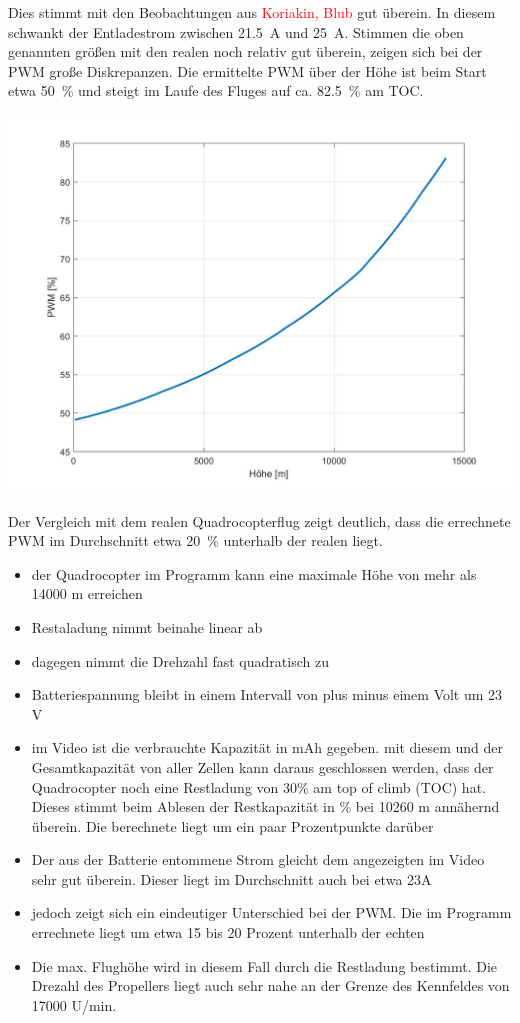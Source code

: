 Dies stimmt mit den Beobachtungen aus \textcolor{red}{Koriakin, Blub} gut überein. In diesem schwankt der Entladestrom zwischen \SI{21,5}{A} und \SI{25}{A}.
Stimmen die oben genannten größen mit den realen noch relativ gut überein, zeigen sich bei der PWM große Diskrepanzen. Die ermittelte PWM über der Höhe ist beim Start etwa \SI{50}{\%} und steigt im Laufe des Fluges auf ca. \SI{82,5}{\%} am TOC. 
\begin{center}
	\includegraphics[scale=0.3]{Diagramme/PWM.jpg}
	\label{pic:pwm_russland}
\end{center}
Der Vergleich mit dem realen Quadrocopterflug zeigt deutlich, dass die errechnete PWM im Durchschnitt etwa \SI{20}{\%} unterhalb der realen liegt.

\begin{itemize}
	\item der Quadrocopter im Programm kann eine maximale Höhe von mehr als 14000 m erreichen
	\item Restaladung nimmt beinahe linear ab
	\item dagegen nimmt die Drehzahl fast quadratisch zu
	\item Batteriespannung bleibt in einem Intervall von  plus minus einem Volt um 23 V
	\item im Video ist die verbrauchte Kapazität in mAh gegeben. mit diesem und der Gesamtkapazität von aller Zellen kann daraus geschlossen werden, dass der Quadrocopter noch eine Restladung von 30\% am top of climb (TOC) hat. Dieses stimmt beim Ablesen der Restkapazität in \% bei 10260 m annähernd überein. Die berechnete liegt um ein paar Prozentpunkte darüber
	\item Der aus der Batterie entommene Strom gleicht dem angezeigten im Video sehr gut überein. Dieser liegt im Durchschnitt auch bei etwa 23A
	\item jedoch zeigt sich ein eindeutiger Unterschied bei der PWM. Die im Programm errechnete liegt um etwa 15 bis 20 Prozent unterhalb der echten
	\item Die max. Flughöhe wird in diesem Fall durch die Restladung bestimmt. Die Drezahl des Propellers liegt auch sehr nahe an der Grenze des Kennfeldes von 17000 U/min.
\end{itemize} 

